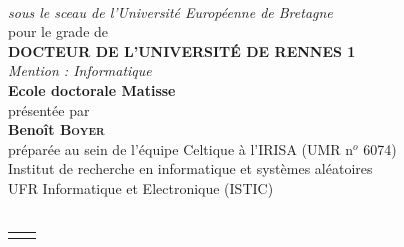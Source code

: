 \documentclass[10pt]{book}
\begin{document}
\begin{titlepage}
\begin{center}
\begin{minipage}{\glarg}
\vspace{0.5cm}
\\ \vspace{0mm}\emph{\Large sous le sceau de l'Universit\'e Europ\'eenne de Bretagne}\\ \vspace{0.5cm}
{\Large pour le grade de}\\ \vspace{2mm}
{\Large\bf DOCTEUR DE L'UNIVERSIT\'E DE RENNES 1}\\ \vspace{0.4cm}
\emph{\Large Mention : Informatique}\\ \vspace{2mm}
{\Large\bf Ecole doctorale Matisse}\\ \vspace{0.3cm}
{\Large présentée par} \\ \vspace{3mm}
{\Huge\bf Benoît \textsc{Boyer}}\\ \vspace{0.4cm}
{\Large préparée au sein de l'équipe Celtique à l'IRISA (UMR n$^o$ 6074)\\
Institut de recherche en informatique et systèmes aléatoires\\
UFR Informatique et Electronique (ISTIC)}\vspace{0.3cm}
\\
\hspace{-20mm}{\rule{\Glarg}{1pt}}\\
\vspace{8mm}

\begin{tabular}{p{6cm}p{10cm}}
\begin{minipage}{\plarg}
\vspace{-0cm}
\hspace{-1.8cm}{\huge\bf Réécriture}\vspace{10mm}

\hspace{-1.8cm}{\huge\bf \quad  d'automates}\vspace{10mm}

\hspace{-1.8cm}{\huge\bf \quad  \quad certifiée pour la}\vspace{10mm}

\hspace{-1.8cm}{\huge\bf \quad  vérification de}\vspace{10mm}


\end{minipage}
\end{tabular}
\end{minipage}
\end{center}
\end{titlepage}
\end{document}
